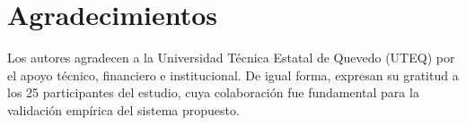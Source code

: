 \documentclass[journal]{IEEEtran}
\begin{document}
	\section*{Agradecimientos}
	Los autores agradecen a la Universidad T\'ecnica Estatal de Quevedo (UTEQ) por el apoyo t\'ecnico, financiero e institucional. De igual forma, expresan su gratitud a los 25 participantes del estudio, cuya colaboraci\'on fue fundamental para la validaci\'on emp\'irica del sistema propuesto.

	
	
	
\end{document}
